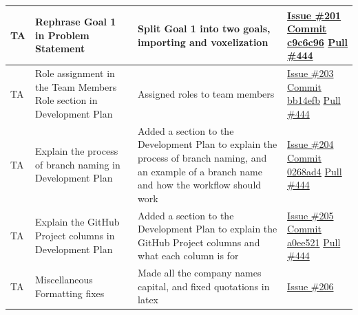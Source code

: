 \documentclass[12pt, titlepage]{article}
\begin{document}
\begin{longtable}{|p{2cm}|p{4cm}|p{5cm}|p{4cm}|}
TA & Rephrase Goal 1 in Problem Statement & Split Goal 1 into two goals, importing and voxelization & \href{https://github.com/OmarHassanAdelhamid/Five-of-a-Kind-capstone-project-/issues/201}{Issue \#201}
\newline\href{https://github.com/OmarHassanAdelhamid/Five-of-a-Kind-capstone-project-/commit/c9c6c96d6cef5467090ec0b501c69eb57f151dff}{Commit c9c6c96}
\newline\href{https://github.com/OmarHassanAdelhamid/Five-of-a-Kind-capstone-project-/pull/444}{Pull \#444} \\ \hline
TA & Role assignment in the Team Members Role section in Development Plan & Assigned roles to team members & \href{https://github.com/OmarHassanAdelhamid/Five-of-a-Kind-capstone-project-/issues/203}{Issue \#203}
\newline\href{https://github.com/OmarHassanAdelhamid/Five-of-a-Kind-capstone-project-/pull/444/changes/bb14efbbfa486f5d750438d007afd9fe1afd357d}{Commit bb14efb}
\newline\href{https://github.com/OmarHassanAdelhamid/Five-of-a-Kind-capstone-project-/pull/444}{Pull \#444} \\ \hline
TA & Explain the process of branch naming in Development Plan & Added a section to the Development Plan to explain the process of branch naming, and an example of a branch name and how the workflow should work & \href{https://github.com/OmarHassanAdelhamid/Five-of-a-Kind-capstone-project-/issues/204}{Issue \#204}
\newline\href{https://github.com/OmarHassanAdelhamid/Five-of-a-Kind-capstone-project-/pull/444/changes/0268ad4cb4da45d1eed467240ab981dc53d6b717}{Commit 0268ad4}
\newline\href{https://github.com/OmarHassanAdelhamid/Five-of-a-Kind-capstone-project-/pull/444}{Pull \#444} \\ \hline
TA & Explain the GitHub Project columns in Development Plan & Added a section to the Development Plan to explain the GitHub Project columns and what each column is for & \href{https://github.com/OmarHassanAdelhamid/Five-of-a-Kind-capstone-project-/issues/205}{Issue \#205}
\newline\href{https://github.com/OmarHassanAdelhamid/Five-of-a-Kind-capstone-project-/pull/444/changes/a0ee521233ef5d3ab557145560fa44962be43c88}{Commit a0ee521}
\newline\href{https://github.com/OmarHassanAdelhamid/Five-of-a-Kind-capstone-project-/pull/444}{Pull \#444} \\ \hline
TA & Miscellaneous Formatting fixes & Made all the company names capital, and fixed quotations in latex & \href{https://github.com/OmarHassanAdelhamid/Five-of-a-Kind-capstone-project-/issues/206}{Issue \#206}

\end{longtable}
\end{document}
